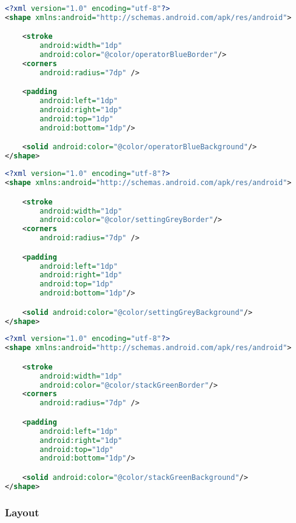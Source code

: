 \begin{lstlisting}[caption=tile\_operator\_blue.xml,label=list:tile_operator_blue.xml,language=XML]
<?xml version="1.0" encoding="utf-8"?>
<shape xmlns:android="http://schemas.android.com/apk/res/android">

    <stroke
        android:width="1dp"
        android:color="@color/operatorBlueBorder"/>
    <corners
        android:radius="7dp" />

    <padding
        android:left="1dp"
        android:right="1dp"
        android:top="1dp"
        android:bottom="1dp"/>

    <solid android:color="@color/operatorBlueBackground"/>
</shape>
\end{lstlisting}    

\begin{lstlisting}[caption=tile\_settings\_grey.xml,label=list:tile_settings_grey.xml,language=XML]
<?xml version="1.0" encoding="utf-8"?>
<shape xmlns:android="http://schemas.android.com/apk/res/android">

    <stroke
        android:width="1dp"
        android:color="@color/settingGreyBorder"/>
    <corners
        android:radius="7dp" />

    <padding
        android:left="1dp"
        android:right="1dp"
        android:top="1dp"
        android:bottom="1dp"/>

    <solid android:color="@color/settingGreyBackground"/>
</shape>
\end{lstlisting}    

\begin{lstlisting}[caption=tile\_stack\_green.xml,label=list:tile_stack_green.xml,language=XML]
<?xml version="1.0" encoding="utf-8"?>
<shape xmlns:android="http://schemas.android.com/apk/res/android">

    <stroke
        android:width="1dp"
        android:color="@color/stackGreenBorder"/>
    <corners
        android:radius="7dp" />

    <padding
        android:left="1dp"
        android:right="1dp"
        android:top="1dp"
        android:bottom="1dp"/>

    <solid android:color="@color/stackGreenBackground"/>
</shape>
\end{lstlisting}    
  
\subsubsection{Layout}

